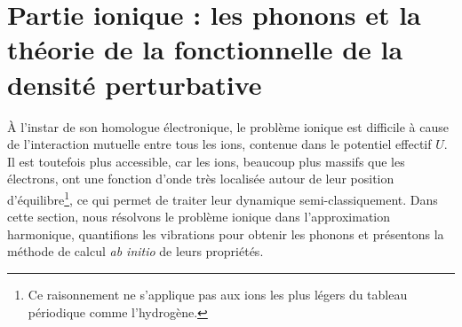 \section{Partie ionique : les phonons et la théorie de la fonctionnelle de la densité perturbative}\label{sec:phonons}
À l'instar de son homologue électronique, le problème ionique est difficile à cause de l'interaction mutuelle entre tous les ions, contenue dans le potentiel effectif $U$. Il est toutefois plus accessible, car les ions, beaucoup plus massifs que les électrons, ont une fonction d'onde très localisée autour de leur position d'équilibre\footnote{Ce raisonnement ne s'applique pas aux ions les plus légers du tableau périodique comme l'hydrogène.}, ce qui permet de traiter leur dynamique semi-classiquement. Dans cette section, nous résolvons le problème ionique dans l'approximation harmonique, quantifions les vibrations pour obtenir les phonons et présentons la méthode de calcul \textit{ab initio} de leurs propriétés.

